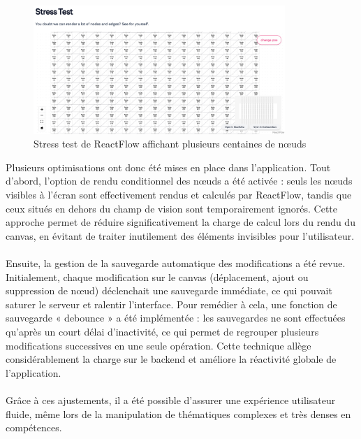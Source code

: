 \documentclass[12pt]{article}
\begin{document}
\begin{figure}[H]
  \centering
  \includegraphics[width=0.85\textwidth]{img/stress-test.png}
  \caption{Stress test de ReactFlow affichant plusieurs centaines de nœuds}
\end{figure}
\noindent
Plusieurs optimisations ont donc été mises en place dans l’application. Tout d’abord, l’option de rendu conditionnel des nœuds a été activée : seuls les nœuds visibles à l’écran sont effectivement rendus et calculés par ReactFlow, tandis que ceux situés en dehors du champ de vision sont temporairement ignorés. Cette approche permet de réduire significativement la charge de calcul lors du rendu du canvas, en évitant de traiter inutilement des éléments invisibles pour l’utilisateur.
\\\\
Ensuite, la gestion de la sauvegarde automatique des modifications a été revue. Initialement, chaque modification sur le canvas (déplacement, ajout ou suppression de nœud) déclenchait une sauvegarde immédiate, ce qui pouvait saturer le serveur et ralentir l’interface. Pour remédier à cela, une fonction de sauvegarde « debounce » a été implémentée : les sauvegardes ne sont effectuées qu’après un court délai d’inactivité, ce qui permet de regrouper plusieurs modifications successives en une seule opération. Cette technique allège considérablement la charge sur le backend et améliore la réactivité globale de l’application.
\\\\
Grâce à ces ajustements, il a été possible d’assurer une expérience utilisateur fluide, même lors de la manipulation de thématiques complexes et très denses en compétences.
\end{document}
